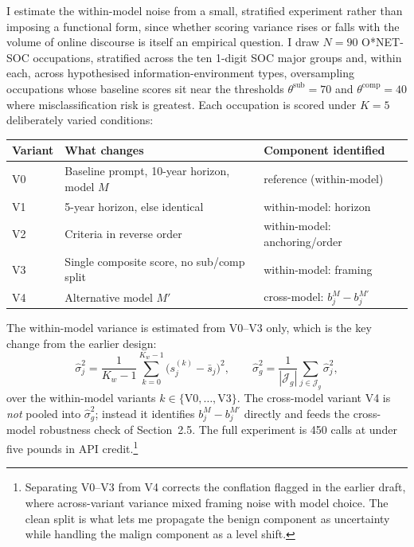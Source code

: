 I estimate the within-model noise from a small, stratified experiment rather than imposing a functional form, since whether scoring variance rises or falls with the volume of online discourse is itself an empirical question. I draw $N=90$ O*NET-SOC occupations, stratified across the ten 1-digit SOC major groups and, within each, across hypothesised information-environment types, oversampling occupations whose baseline scores sit near the thresholds $\theta^{\mathrm{sub}}=70$ and $\theta^{\mathrm{comp}}=40$ where misclassification risk is greatest. Each occupation is scored under $K=5$ deliberately varied conditions:
\begin{center}\footnotesize
\begin{tabular}{@{}lll@{}}
\toprule
Variant & What changes & Component identified\\
\midrule
V0 & Baseline prompt, 10-year horizon, model $M$ & reference (within-model)\\
V1 & 5-year horizon, else identical & within-model: horizon\\
V2 & Criteria in reverse order & within-model: anchoring/order\\
V3 & Single composite score, no sub/comp split & within-model: framing\\
V4 & Alternative model $M'$ & cross-model: $b^{M}_j-b^{M'}_j$\\
\bottomrule
\end{tabular}
\end{center}

The within-model variance is estimated from V0--V3 only, which is the key change from the earlier design:
\begin{equation}
\hat\sigma^2_j=\frac{1}{K_w-1}\sum_{k=0}^{K_w-1}\big(s^{(k)}_j-\bar s_j\big)^2,
\qquad
\hat\sigma^2_g=\frac{1}{|\mathcal{J}_g|}\sum_{j\in\mathcal{J}_g}\hat\sigma^2_j,
\label{eq:varest}
\end{equation}
over the within-model variants $k\in\{\text{V0},\dots,\text{V3}\}$. The cross-model variant V4 is \emph{not} pooled into $\hat\sigma^2_g$; instead it identifies $b^{M}_j-b^{M'}_j$ directly and feeds the cross-model robustness check of Section~2.5. The full experiment is 450 calls at under five pounds in API credit.\footnote{Separating V0--V3 from V4 corrects the conflation flagged in the earlier draft, where across-variant variance mixed framing noise with model choice. The clean split is what lets me propagate the benign component as uncertainty while handling the malign component as a level shift.}

